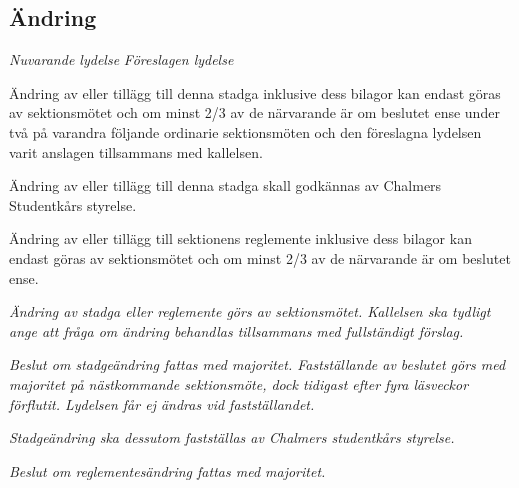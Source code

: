 \documentclass{article}
\newenvironment{lydelse}
    {\begin{paracol}{2}%
        \emph{Nuvarande lydelse}%
        \switchcolumn%
        \emph{Föreslagen lydelse}%
    \end{paracol}%
    \begin{enumerate}[label=\thesubsection.\arabic*]%
    \begin{paracol}{2}%
    }{\end{paracol}\end{enumerate}}
\begin{document}
\subsection{Ändring}
\begin{lydelse}
  \setcounter{subsection}{2}
  \item Ändring av eller tillägg till denna stadga inklusive dess bilagor kan endast göras av sektionsmötet och om minst 2/3 av de närvarande är om beslutet ense under två på varandra följande ordinarie sektionsmöten och den föreslagna lydelsen varit anslagen tillsammans med kallelsen. \label{15.1:ändring}
  \item Ändring av eller tillägg till denna stadga skall godkännas av Chalmers Studentkårs styrelse.
  \setcounter{subsection}{3}
  \setcounter{enumi}{0}  
  \item Ändring av eller tillägg till sektionens reglemente inklusive dess bilagor kan endast göras av sektionsmötet och om minst 2/3 av de närvarande är om beslutet ense.
  \switchcolumn
  \item \emph{Ändring av stadga eller reglemente görs av sektionsmötet. Kallelsen ska tydligt ange att fråga om ändring behandlas tillsammans med fullständigt förslag.}
  \item \emph{Beslut om stadgeändring fattas med  majoritet.
      Fastställande av beslutet görs med  majoritet på nästkommande sektionsmöte, dock tidigast efter fyra läsveckor förflutit.
      Lydelsen får ej ändras vid fastställandet.} \label{maj:sä}
  \item \emph{Stadgeändring ska dessutom fastställas av Chalmers studentkårs styrelse.}
  \item \emph{Beslut om reglementesändring fattas med  majoritet.} \label{maj:rä}
\end{lydelse}
\setcounter{section}{15}
\setcounter{subsection}{1}
\end{document}
